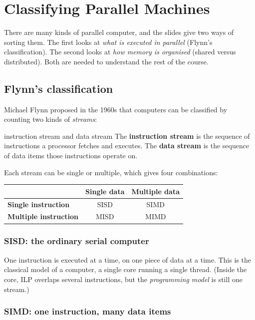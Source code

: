 \chapter{Classifying Parallel Machines}
\label{ch:classify}

There are many kinds of parallel computer, and the slides give two ways of sorting them. The first looks
at \emph{what is executed in parallel} (Flynn's classification). The second looks at \emph{how memory is organised}
(shared versus distributed). Both are needed to understand the rest of the course.

\section{Flynn's classification}

Michael Flynn proposed in the 1960s that computers can be classified by counting two kinds of
\emph{streams}:

\begin{definition}{instruction stream and data stream}
The \textbf{instruction stream} is the sequence of instructions a processor fetches and executes.
The \textbf{data stream} is the sequence of data items those instructions operate on.
\end{definition}

Each stream can be single or multiple, which gives four combinations:

\begin{center}
\begin{tabular}{@{}l|c|c@{}}
 & \textbf{Single data} & \textbf{Multiple data}\\ \hline
\textbf{Single instruction} & SISD & SIMD\\ \hline
\textbf{Multiple instruction} & MISD & MIMD\\
\end{tabular}
\end{center}

\subsection{SISD: the ordinary serial computer}

One instruction is executed at a time, on one piece of data at a time. This is the classical model
of a computer, a single core running a single thread. (Inside the core, ILP overlaps several
instructions, but the \emph{programming model} is still one stream.)

\subsection{SIMD: one instruction, many data items}

